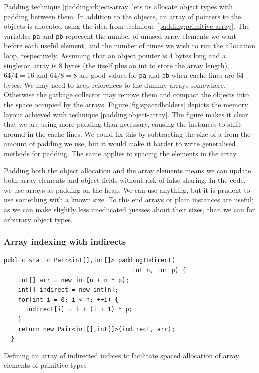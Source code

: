 Padding technique \ref{padding:object-array} lets us allocate object
types with padding between them. In addition to the objects, an array of
pointers to the objects is allocated using the idea from technique
\ref{padding:primitive-array}. The variables \texttt{pa} and \texttt{pb}
represent the number of unused array elements we want before each useful
element, and the number of times we wish to run the allocation loop,
respectively. Assuming that an object pointer is 4 bytes long and a singleton
 array is 8 bytes (the  itself plus an int  to
store the array length), $64/4 = 16$ and $64/8 = 8$ are good values for
\texttt{pa} and \texttt{pb} when cache lines are 64 bytes. We may need to keep
references to the dummy arrays somewhere. Otherwise the garbage collector may
remove them and compact the objects into the space occupied by the arrays.
Figure \ref{fig:spacedholders} depicts the memory layout achieved with technique
\ref{padding:object-array}. The figure makes it clear that we are using more
padding than necessary, causing the  instances to shift around in
the cache lines. We could fix this by subtracting the size of a 
from the amount of padding we use, but it would make it harder to write
generalised methods for padding. The same applies to spacing the elements in the
array.

Padding both the object allocation and the array elements means we can update
both array elements and object fields without risk of false sharing. In the
code, we use   arrays as padding on the heap. We can use anything, but it is
prudent to use something with a known size. To this end arrays or plain
 instances are useful; as we can make slightly less uneducated
guesses about their sizes, than we can for arbitrary object types.

\subsubsection{Array indexing with indirects}

\begin{padding}[h]
\begin{Verbatim}[frame=single]
  public static Pair<int[],int[]> paddingIndirect(
                                    int n, int p) {
    int[] arr = new int[n + n * p];
    int[] indirect = new int[n];
    for(int i = 0; i < n; ++i) {
      indirect[i] = i + (i + 1) * p;
    }
    return new Pair<int[],int[]>(indirect, arr);
  }
\end{Verbatim}
	\caption{Defining an array of indirected indices to facilitate spaced
	allocation of array elements of primitive types}
	\label{padding:primitive-array-indirect}
\end{padding}

